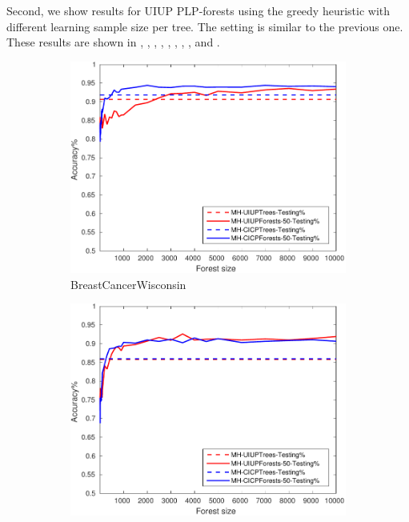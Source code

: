 Second, we show results for UIUP PLP-forests using the greedy
heuristic with different learning sample size per tree.
The setting is similar to the previous one.
These results are shown in , , , ,
, , , , and .

\begin{figure}[ht]
	\centering

  \begin{subfigure}[b]{0.3\textwidth}
		\centering
		\includegraphics[width=\textwidth]{figs/PLPTF/Forests/BreastCancerWisconsinDownsampled_Forests_MH.pdf}
		\caption{BreastCancerWisconsin}
		\label{fig:B4}
	\end{subfigure}
  \begin{subfigure}[b]{0.3\textwidth}
		\centering
  	\includegraphics[width=\textwidth]{figs/PLPTF/Forests/CarEvaluation_Forests_MH.pdf}

\end{subfigure}
\end{figure}
